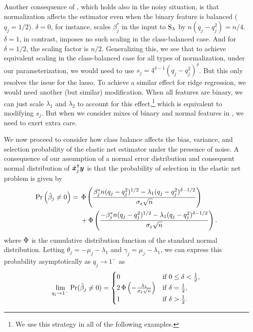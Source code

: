 Another consequence of , which holds also in the noisy
situation, is that normalization affects the estimator even when the binary feature is
balanced (\(q_j = 1/2\)). \(\delta = 0\), for instance, scales \(\beta_j^*\) in the input
to \(\operatorname{S}_\lambda\) by \(n (q_j - q_j^2) = n/4\). \(\delta = 1\), in contrast, imposes no
such scaling in the class-balanced case. And for \(\delta = 1/2\), the scaling factor is
\(n/2\). Generalizing this, we see that to achieve equivalent scaling in the class-balanced
case for all types of normalization, under our parameterization, we would need to use \(s_j
= 4^{\delta - 1} (q_j - q_j^2)^\delta\). But this only resolves the issue for the lasso. To
achieve a similar effect for ridge regression, we would need another (but similar)
modification. When all features are binary, we can just scale \(\lambda_1\) and
\(\lambda_2\) to account for this effect,\footnote{We use this strategy in all of the
  following examples.} which is equivalent to modifying \(s_j\). But when we consider mixes
of binary and normal features in , we need to exert extra care.

We now proceed to consider how class balance affects the bias, variance, and selection
probability of the elastic net estimator under the presence of noise. A consequence of our
assumption of a normal error distribution and consequent normal distribution of
\(\tilde{\bm{x}}_j^\intercal \bm{y}\) is that the probability of selection in the elastic net
problem is given by
\begin{align}
  \label{eq:selection-probability}
  \Pr\left(\hat{\beta}_j \neq 0\right)  ={} & \operatorname{\Phi} \left( \frac{\beta_j^*n (q_j-q_j^2)^{1/2} - \lambda_1(q_j-q_j^2)^{\delta - 1/2}}{\sigma_\varepsilon \sqrt{n}}\right)\nonumber \\
                                            & + \operatorname{\Phi} \left( \frac{-\beta_j^*n (q_j-q_j^2)^{1/2} - \lambda_1(q_j-q_j^2)^{\delta - 1/2}}{\sigma_\varepsilon \sqrt{n}}\right).
\end{align}
where \(\operatorname{\Phi}\) is the cumulative distribution function of the standard normal distribution.
Letting \(\theta_j = -\mu_j - \lambda_1 \) and \(\gamma_j = \mu_j - \lambda_1\), we can
express this probability asymptotically as \(q_j \rightarrow 1^-\) as
\begin{equation}
  \label{eq:selection-probability-limit}
  \lim_{q_j \rightarrow 1^-} \Pr(\hat{\beta}_j \neq 0) =
  \begin{cases}
    0                                                                & \text{if } 0 \leq \delta < \frac{1}{2}, \\
    2\operatorname{\Phi}\left(-\frac{\lambda_1}{\sigma_\varepsilon \sqrt{n}}\right) & \text{if } \delta = \frac{1}{2},        \\
    1                                                                & \text{if } \delta > \frac{1}{2}.
  \end{cases}
\end{equation}

